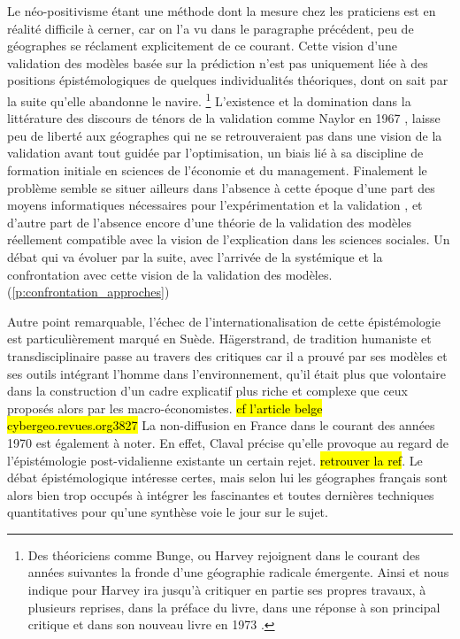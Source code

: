 Le néo-positivisme étant une méthode dont la mesure chez les praticiens est en réalité difficile à cerner, car on l'a vu dans le paragraphe précédent, peu de géographes se réclament explicitement de ce courant. Cette vision d'une validation des modèles basée sur la prédiction n'est pas uniquement liée à des positions épistémologiques de quelques individualités théoriques, dont on sait par la suite qu'elle abandonne le navire. \footnote{Des théoriciens comme Bunge, ou Harvey rejoignent dans le courant des années suivantes la fronde d'une géographie radicale émergente. Ainsi \textcite[30]{Johnston2008} et \textcite[37]{Barnes2006b} nous indique pour Harvey ira jusqu'à critiquer en partie ses propres travaux, à plusieurs reprises, dans la préface du livre, dans une réponse à son principal critique \textcite{Gale1972} et dans son nouveau livre en 1973 \autocite{Harvey1972} \autocite[166-168]{Gould2004}.}  L'existence et la domination dans la littérature des discours de ténors de la validation comme Naylor en 1967 \autocite{Naylor1967}, laisse peu de liberté aux géographes qui ne se retrouveraient pas dans une vision de la validation avant tout guidée par l'optimisation, un biais lié à sa discipline de formation initiale en sciences de l'économie et du management. Finalement le problème semble se situer ailleurs dans l'absence à cette époque d'une part des moyens informatiques nécessaires pour l'expérimentation et la validation \autocite{Haggett1969, Marble1972}, et d'autre part de l'absence encore d'une théorie de la validation des modèles réellement compatible avec la vision de l'explication dans les sciences sociales. Un débat qui va évoluer par la suite, avec l'arrivée de la systémique et la confrontation avec cette vision de la validation des modèles. (\ref{p:confrontation_approches})

Autre point remarquable, l'échec de l'internationalisation de cette épistémologie est particulièrement marqué en Suède. Hägerstrand, de tradition humaniste et transdisciplinaire \autocite{Bailly2000} passe au travers des critiques car il a prouvé par ses modèles et ses outils intégrant l'homme dans l'environnement, qu'il était plus que volontaire dans la construction d'un cadre explicatif plus riche et complexe que ceux proposés alors par les macro-économistes. \hl{cf l'article belge cybergeo.revues.org\/3827} La non-diffusion en France dans le courant des années 1970 est également à noter. En effet, Claval précise qu'elle provoque au regard de l'épistémologie post-vidalienne existante un certain rejet. \hl{retrouver la ref}. Le débat épistémologique intéresse certes, mais selon lui les géographes français sont alors bien trop occupés à intégrer les fascinantes et toutes dernières techniques quantitatives pour qu'une synthèse voie le jour sur le sujet.\autocite[27-29]{Claval2003}

